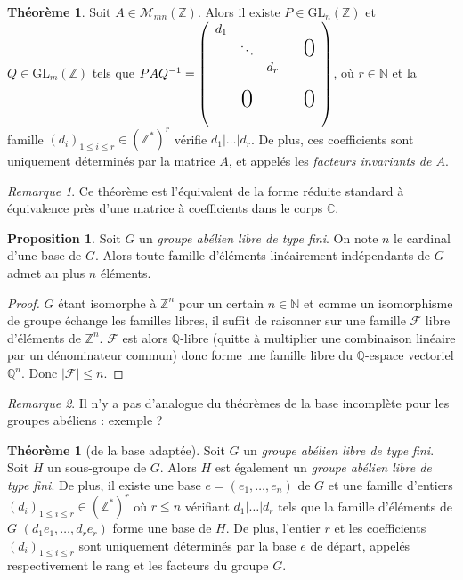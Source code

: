 \documentclass{article}
\newcommand{\Q}{\mathbb{Q}}
\newcommand{\Z}{\mathbb{Z}}
\newcommand{\C}{\mathbb{C}}
\newcommand{\N}{\mathbb{N}}
\theoremstyle{definition}
\newtheorem{theo}[defi]{Théorème}
\newtheorem{prop}[defi]{Proposition}
\theoremstyle{remark}
\newtheorem{rem}{Remarque}
\begin{document}
\begin{theo}
Soit $A \in \mathcal{M}_{mn}(\Z)$. Alors il existe $P \in \textrm{GL}_n(\Z)$ et $Q \in \textrm{GL}_m(\Z)$ tels que $PAQ^{-1}=\left(
 \begin{array}{cccccc}
   d_1\\
   & \ddots & & & \text{\huge0} \\
    &  & d_r & \\
    & & \\
    & \text{\huge0} & & & \text{\huge0} \\
    & & & & 
 \end{array}
\right)$, où $ r \in \N$ et la famille $(d_i)_{1 \leqslant i \leqslant r} \in (\Z^*)^r$ vérifie $d_1 \vert \ldots \vert d_r$. De plus, ces coefficients sont uniquement déterminés par la matrice $A$, et appelés les \textit{facteurs invariants de $A$}.
\end{theo}

\begin{rem}
Ce théorème est l'équivalent de la forme réduite standard à équivalence près d'une matrice à coefficients dans le corps $\C$.
\end{rem}

\begin{prop}
Soit $G$ un \textit{groupe abélien libre de type fini}. On note $n$ le cardinal d'une base de $G$. Alors toute famille d'éléments linéairement indépendants de $G$ admet au plus $n$ éléments.
\end{prop}

\begin{proof}$G$ étant isomorphe à $\Z^n$ pour un certain $n \in \N$ et comme un isomorphisme de groupe échange les familles libres, il suffit de raisonner sur une famille $\mathcal{F}$ libre d'éléments de $\Z^n$. $\mathcal{F}$ est alors $\Q$-libre (quitte à multiplier une combinaison linéaire par un dénominateur commun) donc forme une famille libre du $\Q$-espace vectoriel $\Q^n$. Donc $\vert \mathcal{F} \vert \leqslant n$.
\end{proof}

\begin{rem}
Il n'y a pas d'analogue du théorèmes de la base incomplète pour les groupes abéliens : exemple ?
\end{rem}

\begin{theo}[de la base adaptée]
Soit $G$ un \textit{groupe abélien libre de type fini}. Soit $H$ un sous-groupe de $G$. Alors $H$ est également un \textit{groupe abélien libre de type fini}. De plus, il existe une base $e=(e_1, \ldots, e_n)$ de $G$ et une famille d'entiers $(d_i)_{1 \leqslant i \leqslant r} \in (\Z^*)^r$ où $r \leqslant n$ vérifiant $d_1 \vert \ldots \vert d_r$ tels que la famille d'éléments de $G$ $(d_1e_1, \ldots, d_re_r)$ forme une base de $H$. De plus, l'entier $r$ et les coefficients $(d_i)_{1 \leqslant i \leqslant r}$ sont uniquement déterminés par la base $e$ de départ, appelés respectivement le rang et les facteurs du groupe $G$.
\end{theo}
\end{document}
